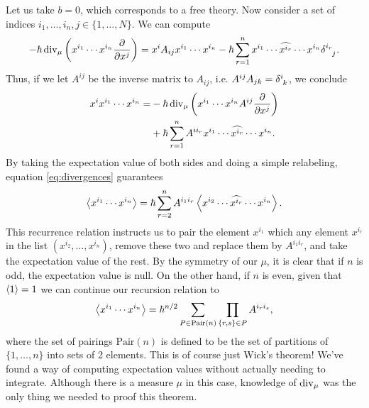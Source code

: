 Let us take $b=0$, which corresponds to a free theory. Now consider a set of indices $i_1,\dots,i_n,j\in\{1,\dots,N\}$. We can compute
\begin{equation}
-\hbar\Div_\mu \qty(x^{i_1}\cdots x^{i_n}\pdv{x^j})=x^iA_{ij}x^{i_1}\cdots x^{i_n}-\hbar\sum_{r=1}^n x^{i_1}\cdots \widehat{x^{i_r}}\cdots x^{i_n}\delta\indices{^{i_r}_j}.
\end{equation}
Thus, if we let $A^{ij}$ be the inverse matrix to $A_{ij}$, i.e. $A^{ij}A_{jk}=\delta\indices{^i_k}$, we conclude
\begin{equation}\label{eq:image_Q}
\begin{aligned}
x^ix^{i_1}\cdots x^{i_n}=&-\hbar\operatorname{div}_\mu\qty(x^{i_1}\cdots x^{i_n}A^{ij}\pdv{x^j})\\
&+\hbar\sum_{r=1}^n A^{ii_r}x^{i_1}\cdots \widehat{x^{i_r}}\cdots x^{i_n}.
\end{aligned}
\end{equation}
By taking the expectation value of both sides and doing a simple relabeling, equation \eqref{eq:divergences} guarantees
\begin{equation}
\ev{x^{i_1}\cdots x^{i_n}}=\hbar\sum_{r=2}^n A^{i_1 i_r}\ev{x^{i_2}\cdots \widehat{x^{i_r}}\cdots x^{i_n}}.
\end{equation}
This recurrence relation instructs us to pair the element $x^{i_1}$ which any element $x^{i_r}$ in the list $(x^{i_2},\dots,x^{i_n})$, remove these two and replace them by $A^{i_1 i_r}$, and take the expectation value of the rest. By the symmetry of our $\mu$, it is clear that if $n$ is odd, the expectation value is null. On the other hand, if $n$ is even, given that $\ev{1}=1$ we can continue our recursion relation to
\begin{equation}
\ev{x^{i_1}\cdots x^{i_n}}=\hbar^{n/2}\sum_{P\in\text{Pair}(n)}\prod_{\{r,s\}\in P} A^{i_r i_s},
\end{equation}
where the set of pairings $\text{Pair}(n)$ is defined to be the set of partitions of $\{1,\dots,n\}$ into sets of 2 elements. This is of course just Wick's theorem! We've found a way of computing expectation values without actually needing to integrate. Although there is a measure $\mu$ in this case, knowledge of $\operatorname{div}_\mu$ was the only thing we needed to proof this theorem.

